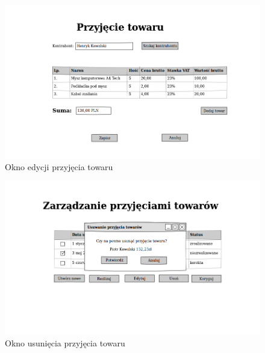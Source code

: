 \begin{figure}[!htb]
  \begin{center}
    \includegraphics[scale=0.45]{../img/interfejs/edycja-przyjecia-towaru.png}
  \end{center}
  \caption{Okno edycji przyjęcia towaru}
\end{figure}
\FloatBarrier

\begin{figure}[!htb]
  \begin{center}
    \includegraphics[scale=0.45]{../img/interfejs/usuniecie-przyjecia-towaru.png}
  \end{center}
  \caption{Okno usunięcia przyjęcia towaru}
\end{figure}
\FloatBarrier

